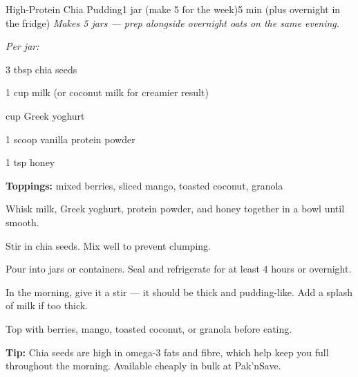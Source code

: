 \begin{recipebox}{High-Protein Chia Pudding}{1 jar (make 5 for the week)}{5 min (plus overnight in the fridge)}
\textit{Makes 5 jars --- prep alongside overnight oats on the same evening.}

\begin{ingredients}
  \item[] \textit{Per jar:}
  \item 3 tbsp chia seeds
  \item 1 cup milk (or coconut milk for creamier result)
  \item \textonehalf{} cup Greek yoghurt
  \item 1 scoop vanilla protein powder
  \item 1 tsp honey
  \item \textbf{Toppings:} mixed berries, sliced mango, toasted coconut, granola
\end{ingredients}

\begin{method}
  \item Whisk milk, Greek yoghurt, protein powder, and honey together in a bowl until smooth.
  \item Stir in chia seeds. Mix well to prevent clumping.
  \item Pour into jars or containers. Seal and refrigerate for at least 4 hours or overnight.
  \item In the morning, give it a stir --- it should be thick and pudding-like. Add a splash of milk if too thick.
  \item Top with berries, mango, toasted coconut, or granola before eating.
\end{method}


\begin{notelist}
  \item \textbf{Tip:} Chia seeds are high in omega-3 fats and fibre, which help keep you full throughout the morning. Available cheaply in bulk at Pak'nSave.
\end{notelist}
\end{recipebox}
